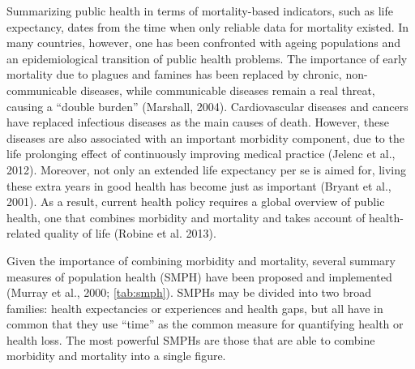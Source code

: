 \documentclass[]{book}
\begin{document}
Summarizing public health in terms of mortality-based indicators, such
as life expectancy, dates from the time when only reliable data for
mortality existed. In many countries, however, one has been confronted
with ageing populations and an epidemiological transition of public
health problems. The importance of early mortality due to plagues and
famines has been replaced by chronic, non-communicable diseases, while
communicable diseases remain a real threat, causing a ``double burden''
(Marshall, 2004). Cardiovascular diseases and cancers have replaced
infectious diseases as the main causes of death. However, these diseases
are also associated with an important morbidity component, due to the
life prolonging effect of continuously improving medical practice
(Jelenc et al., 2012). Moreover, not only an extended life expectancy
per se is aimed for, living these extra years in good health has become
just as important (Bryant et al., 2001). As a result, current health
policy requires a global overview of public health, one that combines
morbidity and mortality and takes account of health-related quality of
life (Robine et al. 2013).

Given the importance of combining morbidity and mortality, several
summary measures of population health (SMPH) have been proposed and
implemented (Murray et al., 2000; \ref{tab:smph}). SMPHs may be divided
into two broad families: health expectancies or experiences and health
gaps, but all have in common that they use ``time'' as the common
measure for quantifying health or health loss. The most powerful SMPHs
are those that are able to combine morbidity and mortality into a single
figure.
\end{document}
